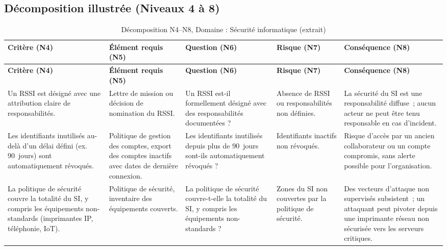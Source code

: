 \subsection{Décomposition illustrée (Niveaux 4 à 8)}
\begin{longtable}{>{\raggedright\arraybackslash}p{3.2cm}
                  >{\raggedright\arraybackslash}p{3cm}
                  >{\raggedright\arraybackslash}p{2.8cm}
                  >{\raggedright\arraybackslash}p{2.6cm}
                  >{\raggedright\arraybackslash}p{2.8cm}}

\caption{Décomposition N4--N8, Domaine : Sécurité informatique (extrait)} \\

\toprule
\textbf{Critère (N4)} & \textbf{Élément requis (N5)} & \textbf{Question (N6)} & \textbf{Risque (N7)} & \textbf{Conséquence (N8)} \\
\midrule
\endfirsthead

\toprule
\textbf{Critère (N4)} & \textbf{Élément requis (N5)} & \textbf{Question (N6)} & \textbf{Risque (N7)} & \textbf{Conséquence (N8)} \\
\midrule
\endhead

\bottomrule
\endlastfoot

Un RSSI est désigné avec une attribution claire de responsabilités. &
Lettre de mission ou décision de nomination du RSSI. &
Un RSSI est-il formellement désigné avec des responsabilités documentées ? &
Absence de RSSI ou responsabilités non définies. &
La sécurité du SI est une responsabilité diffuse~; aucun acteur ne peut être tenu responsable en cas d'incident. \\

\addlinespace

Les identifiants inutilisés au-delà d'un délai défini (ex. 90~jours) sont automatiquement révoqués. &
Politique de gestion des comptes, export des comptes inactifs avec dates de dernière connexion. &
Les identifiants inutilisés depuis plus de 90~jours sont-ils automatiquement révoqués ? &
Identifiants inactifs non révoqués. &
Risque d'accès par un ancien collaborateur ou un compte compromis, sans alerte possible pour l'organisation. \\

\addlinespace

La politique de sécurité couvre la totalité du SI, y compris les équipements non-standards (imprimantes IP, téléphonie, IoT). &
Politique de sécurité, inventaire des équipements couverts. &
La politique de sécurité couvre-t-elle la totalité du SI, y compris les équipements non-standards ? &
Zones du SI non couvertes par la politique de sécurité. &
Des vecteurs d'attaque non supervisés subsistent~; un attaquant peut pivoter depuis une imprimante réseau non sécurisée vers les serveurs critiques. \\


\end{longtable}
